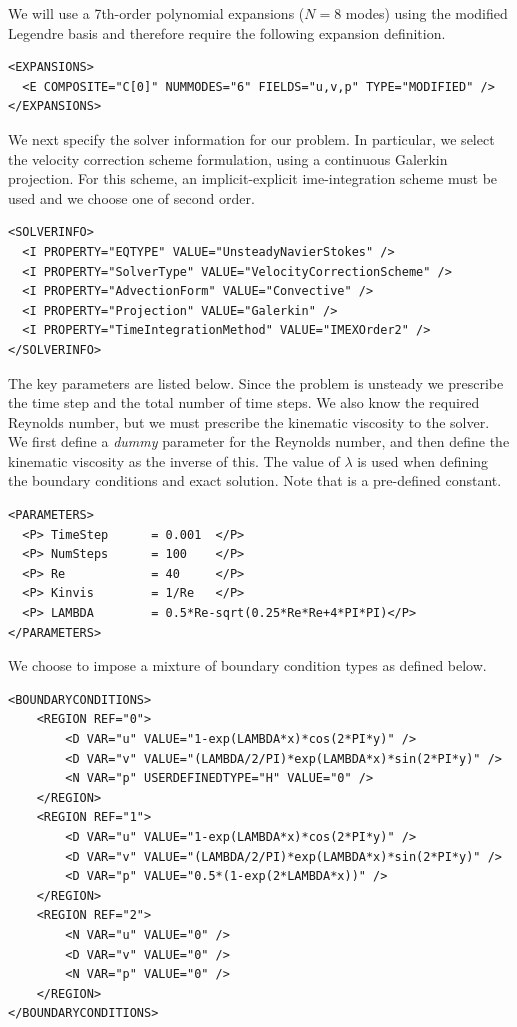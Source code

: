 We will use a 7th-order polynomial expansions ($N=8$ modes) using the
modified Legendre basis and therefore require the following expansion
definition.
\begin{lstlisting}[style=XMLStyle]
<EXPANSIONS>
  <E COMPOSITE="C[0]" NUMMODES="6" FIELDS="u,v,p" TYPE="MODIFIED" />
</EXPANSIONS>
\end{lstlisting}

We next specify the solver information for our problem. In particular, we select
the velocity correction scheme formulation, using a continuous Galerkin
projection. For this scheme, an implicit-explicit ime-integration scheme must be
used and we choose one of second order.
\begin{lstlisting}[style=XMLStyle]
<SOLVERINFO>
  <I PROPERTY="EQTYPE" VALUE="UnsteadyNavierStokes" />
  <I PROPERTY="SolverType" VALUE="VelocityCorrectionScheme" />
  <I PROPERTY="AdvectionForm" VALUE="Convective" />
  <I PROPERTY="Projection" VALUE="Galerkin" />
  <I PROPERTY="TimeIntegrationMethod" VALUE="IMEXOrder2" />
</SOLVERINFO>
\end{lstlisting}

The key parameters are listed below. Since the problem is unsteady we prescribe
the time step and the total number of time steps. We also know the required
Reynolds number, but we must prescribe the kinematic viscosity to the solver. We
first define a \emph{dummy} parameter for the Reynolds number, and then define
the kinematic viscosity as the inverse of this. The value of $\lambda$ is used
when defining the boundary conditions and exact solution. Note that 
is a pre-defined constant.

\begin{lstlisting}[style=XMLStyle]
<PARAMETERS>
  <P> TimeStep      = 0.001  </P>
  <P> NumSteps      = 100    </P>
  <P> Re            = 40     </P>
  <P> Kinvis        = 1/Re   </P>
  <P> LAMBDA        = 0.5*Re-sqrt(0.25*Re*Re+4*PI*PI)</P>
</PARAMETERS>
\end{lstlisting}

We choose to impose a mixture of boundary condition types as defined below.

\begin{lstlisting}[style=XMLStyle]
<BOUNDARYCONDITIONS>
    <REGION REF="0">
        <D VAR="u" VALUE="1-exp(LAMBDA*x)*cos(2*PI*y)" />
        <D VAR="v" VALUE="(LAMBDA/2/PI)*exp(LAMBDA*x)*sin(2*PI*y)" />
        <N VAR="p" USERDEFINEDTYPE="H" VALUE="0" />
    </REGION>
    <REGION REF="1">
        <D VAR="u" VALUE="1-exp(LAMBDA*x)*cos(2*PI*y)" />
        <D VAR="v" VALUE="(LAMBDA/2/PI)*exp(LAMBDA*x)*sin(2*PI*y)" />
        <D VAR="p" VALUE="0.5*(1-exp(2*LAMBDA*x))" />
    </REGION>
    <REGION REF="2">
        <N VAR="u" VALUE="0" />
        <D VAR="v" VALUE="0" />
        <N VAR="p" VALUE="0" />
    </REGION>
</BOUNDARYCONDITIONS>
\end{lstlisting}


